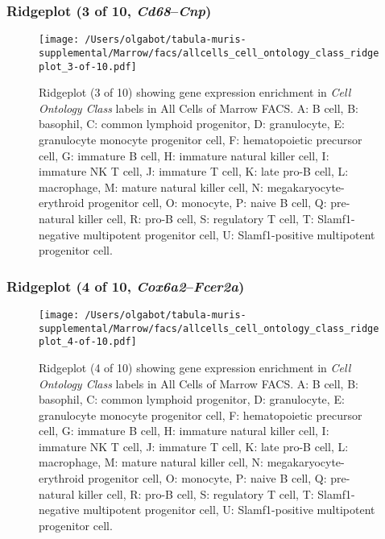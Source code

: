 \subsubsection{Ridgeplot (3 of 10, \emph{Cd68}--\emph{Cnp})}
\begin{figure}[h]
\centering
\texttt{[image: /Users/olgabot/tabula-muris-supplemental/Marrow/facs/allcells\_cell\_ontology\_class\_ridgeplot\_3-of-10.pdf]}

\caption{ Ridgeplot (3 of 10)  showing gene expression enrichment in \emph{Cell Ontology Class} labels in All Cells of Marrow FACS. A: B cell, B: basophil, C: common lymphoid progenitor, D: granulocyte, E: granulocyte monocyte progenitor cell, F: hematopoietic precursor cell, G: immature B cell, H: immature natural killer cell, I: immature NK T cell, J: immature T cell, K: late pro-B cell, L: macrophage, M: mature natural killer cell, N: megakaryocyte-erythroid progenitor cell, O: monocyte, P: naive B cell, Q: pre-natural killer cell, R: pro-B cell, S: regulatory T cell, T: Slamf1-negative multipotent progenitor cell, U: Slamf1-positive multipotent progenitor cell.}
\end{figure}


\clearpage

\subsubsection{Ridgeplot (4 of 10, \emph{Cox6a2}--\emph{Fcer2a})}
\begin{figure}[h]
\centering
\texttt{[image: /Users/olgabot/tabula-muris-supplemental/Marrow/facs/allcells\_cell\_ontology\_class\_ridgeplot\_4-of-10.pdf]}

\caption{ Ridgeplot (4 of 10)  showing gene expression enrichment in \emph{Cell Ontology Class} labels in All Cells of Marrow FACS. A: B cell, B: basophil, C: common lymphoid progenitor, D: granulocyte, E: granulocyte monocyte progenitor cell, F: hematopoietic precursor cell, G: immature B cell, H: immature natural killer cell, I: immature NK T cell, J: immature T cell, K: late pro-B cell, L: macrophage, M: mature natural killer cell, N: megakaryocyte-erythroid progenitor cell, O: monocyte, P: naive B cell, Q: pre-natural killer cell, R: pro-B cell, S: regulatory T cell, T: Slamf1-negative multipotent progenitor cell, U: Slamf1-positive multipotent progenitor cell.}
\end{figure}


\clearpage

